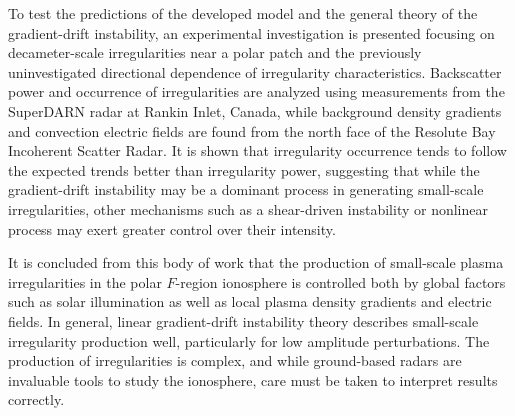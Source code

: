 To test the predictions of the developed model and the general theory of the gradient-drift instability, an experimental investigation is presented focusing on decameter-scale irregularities near a polar patch and the previously uninvestigated directional dependence of irregularity characteristics.  Backscatter power and occurrence of irregularities are analyzed using measurements from the SuperDARN radar at Rankin Inlet, Canada, while background density gradients and convection electric fields are found from the north face of the Resolute Bay Incoherent Scatter Radar.  It is shown that irregularity occurrence tends to follow the expected trends better than irregularity power, suggesting that while the gradient-drift instability may be a dominant process in generating small-scale irregularities, other mechanisms such as a shear-driven instability or nonlinear process may exert greater control over their intensity.

It is concluded from this body of work that the production of small-scale plasma irregularities in the polar \(F\)-region ionosphere is controlled both by global factors such as solar illumination as well as local plasma density gradients and electric fields.  In general, linear gradient-drift instability theory describes small-scale irregularity production well, particularly for low amplitude perturbations.  The production of irregularities is complex, and while ground-based radars are invaluable tools to study the ionosphere, care must be taken to interpret results correctly.

